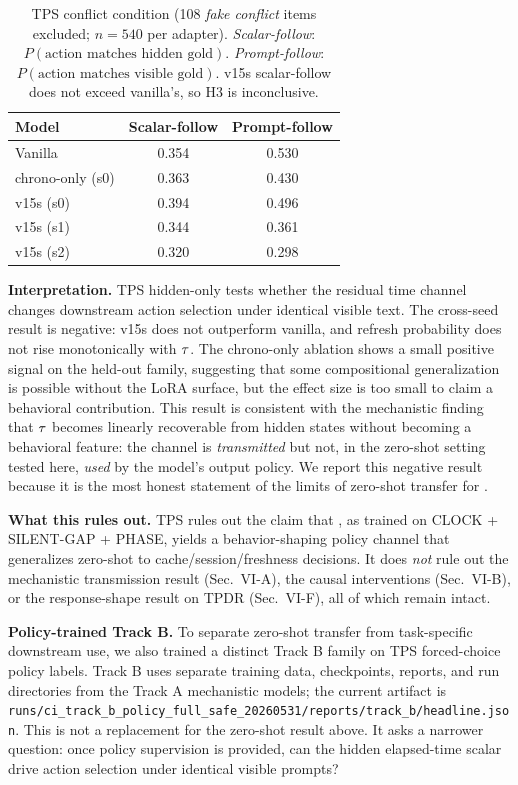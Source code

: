 \begin{table}[t]
\centering
\caption{TPS conflict condition (108 \emph{fake conflict} items excluded; $n=540$ per adapter). \emph{Scalar-follow}: $P(\text{action matches hidden gold})$. \emph{Prompt-follow}: $P(\text{action matches visible gold})$. \CI{} v15s scalar-follow does not exceed vanilla's, so H3 is inconclusive.}
\label{tab:tps-conflict}
\footnotesize
\begin{tabular}{lcc}
\toprule
Model & Scalar-follow & Prompt-follow \\
\midrule
Vanilla & 0.354 & 0.530 \\
chrono-only (s0) & 0.363 & 0.430 \\
\CI{} v15s (s0) & 0.394 & 0.496 \\
\CI{} v15s (s1) & 0.344 & 0.361 \\
\CI{} v15s (s2) & 0.320 & 0.298 \\
\bottomrule
\end{tabular}
\end{table}

\textbf{Interpretation.} TPS hidden-only tests whether the residual time channel changes downstream action selection under identical visible text. The cross-seed result is negative: \CI{} v15s does not outperform vanilla, and refresh probability does not rise monotonically with $\tau$. The chrono-only ablation shows a small positive signal on the held-out family, suggesting that some compositional generalization is possible without the LoRA surface, but the effect size is too small to claim a behavioral contribution. This result is consistent with the mechanistic finding that $\tau$ becomes linearly recoverable from hidden states without becoming a behavioral feature: the channel is \emph{transmitted} but not, in the zero-shot setting tested here, \emph{used} by the model's output policy. We report this negative result because it is the most honest statement of the limits of zero-shot transfer for \CI{}.

\textbf{What this rules out.} TPS rules out the claim that \CI{}, as trained on CLOCK + SILENT-GAP + PHASE, yields a behavior-shaping policy channel that generalizes zero-shot to cache/session/freshness decisions. It does \emph{not} rule out the mechanistic transmission result (Sec.~VI-A), the causal interventions (Sec.~VI-B), or the response-shape result on TPDR (Sec.~VI-F), all of which remain intact.

\textbf{Policy-trained Track B.} To separate zero-shot transfer from task-specific downstream use, we also trained a distinct Track B family on TPS forced-choice policy labels. Track B uses separate training data, checkpoints, reports, and run directories from the Track A mechanistic \CI{} models; the current artifact is \texttt{runs/ci\_track\_b\_policy\_full\_safe\_20260531/reports/track\_b/headline.json}. This is not a replacement for the zero-shot result above. It asks a narrower question: once policy supervision is provided, can the hidden elapsed-time scalar drive action selection under identical visible prompts?

